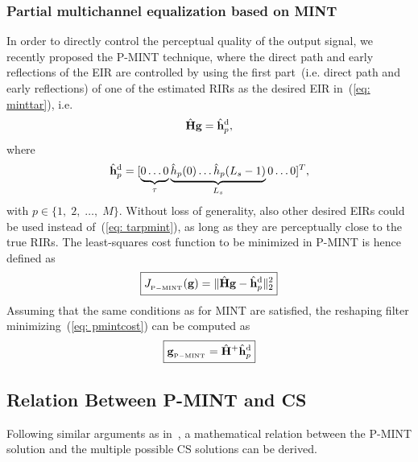 \documentclass[draftcls,onecolumn,11pt]{IEEEtran}
\begin{document}
\subsubsection*{Partial multichannel equalization based on MINT~\cite{Kodrasi_ICASSP_2012}}
In order to directly control the perceptual quality of the output signal, we recently proposed the P-MINT technique, where the direct path and early reflections of the EIR are controlled by using the first part~(i.e. direct path and early reflections) of one of the estimated RIRs as the desired EIR in~(\ref{eq: minttar}), i.e.
\begin{equation}
\label{eq: PMINT}
\hat{\mathbf{H}} \mathbf{g} = \hat{\mathbf{h}}_{p}^{\rm d},
\end{equation}
where
\begin{equation}
\label{eq: tarpmint}
\hat{\mathbf{h}}_{p}^{\rm d} = [\underbrace{0\phantom{\rlap{$(L_s-1)$}} \ldots 0 }_{\tau} \underbrace{\hat{h}_p(0) \ldots \hat{h}_p(L_s-1)}_{L_s} 0 \ldots 0 ]^{T},
\end{equation}
with $p \in \{1, \; 2, \; \ldots, \; M \}$.
Without loss of generality, also other desired EIRs could be used instead of~(\ref{eq: tarpmint}), as long as they are perceptually close to the true RIRs.
The least-squares cost function to be minimized in P-MINT is hence defined as
\begin{equation}
\label{eq: pmintcost}
\boxed{J_{_{\rm P-MINT}}(\mathbf{g}) = \|\hat{\mathbf{H}}\mathbf{g} - \hat{\mathbf{h}}_p^{\rm d}\|_2^2}
\end{equation}
Assuming that the same conditions as for MINT are satisfied, the reshaping filter minimizing~(\ref{eq: pmintcost}) can be computed as
\begin{equation}
\label{eq: Pmintsol}
\boxed{\mathbf{g}_{{}_{\rm P-MINT}} = \hat{\mathbf{H}}^{+}\hat{\mathbf{h}}_p^{\rm d}}
\end{equation}

\subsection{Relation Between P-MINT and CS}
\label{sec: pmint_and_cs}
Following similar arguments as in~\cite{Zhang_IWAENC_2010}, a mathematical relation between the P-MINT solution and the multiple possible CS solutions can be derived.
\end{document}
